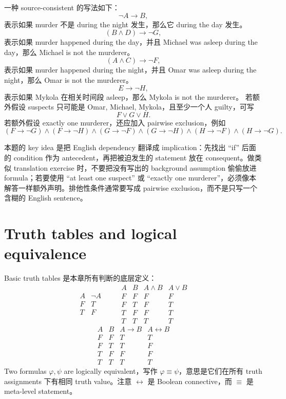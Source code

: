 \begin{solution}
一种 source-consistent 的写法如下：
\[
\lnot A\to B,
\]
表示如果 murder 不是 during the night 发生，那么它 during the day 发生。
\[
(B\land D)\to \lnot G,
\]
表示如果 murder happened during the day，并且 Michael was asleep during the day，那么 Michael is not the murderer。
\[
(A\land C)\to \lnot F,
\]
表示如果 murder happened during the night，并且 Omar was asleep during the night，那么 Omar is not the murderer。
\[
E\to \lnot H,
\]
表示如果 Mykola 在相关时间段 asleep，那么 Mykola is not the murderer。
若额外假设 suspects 只可能是 Omar, Michael, Mykola，且至少一个人 guilty，可写
\[
F\lor G\lor H.
\]
若额外假设 exactly one murderer，还应加入 pairwise exclusion，例如
\[
(F\to\lnot G)\land(F\to\lnot H)\land(G\to\lnot F)\land(G\to\lnot H)\land(H\to\lnot F)\land(H\to\lnot G).
\]
\end{solution}

\begin{explanation}
本题的 key idea 是把 English dependency 翻译成 implication：先找出 ``if'' 后面的 condition 作为 antecedent，再把被迫发生的 statement 放在 consequent。做类似 translation exercise 时，不要把没有写出的 background assumption 偷偷放进 formula；若要使用 ``at least one suspect'' 或 ``exactly one murderer''，必须像本解答一样额外声明。排他性条件通常要写成 pairwise exclusion，而不是只写一个含糊的 English sentence。
\end{explanation}

\section{Truth tables and logical equivalence}

Basic truth tables 是本章所有判断的底层定义：
\[
\begin{array}{c|c}
A&\lnot A\\
\hline
F&T\\
T&F
\end{array}
\qquad
\begin{array}{cc|cc}
A&B&A\land B&A\lor B\\
\hline
F&F&F&F\\
F&T&F&T\\
T&F&F&T\\
T&T&T&T
\end{array}
\]
\[
\begin{array}{cc|cc}
A&B&A\to B&A\leftrightarrow B\\
\hline
F&F&T&T\\
F&T&T&F\\
T&F&F&F\\
T&T&T&T
\end{array}
\]
Two formulas \(\varphi,\psi\) are logically equivalent，写作 \(\varphi\equiv\psi\)，意思是它们在所有 truth assignments 下有相同 truth value。注意 \(\leftrightarrow\) 是 Boolean connective，而 \(\equiv\) 是 meta-level statement。

